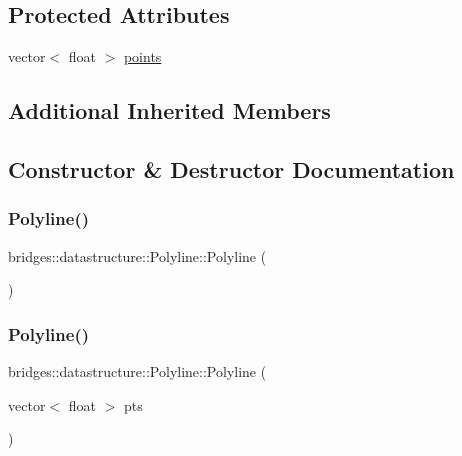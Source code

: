 \subsection*{Protected Attributes}
\begin{DoxyCompactItemize}
\item 
vector$<$ float $>$ \hyperlink{classbridges_1_1datastructure_1_1_polyline_a0df21b6c3cc82930a93a495de5affda7}{points}
\end{DoxyCompactItemize}
\subsection*{Additional Inherited Members}


\subsection{Constructor \& Destructor Documentation}
\mbox{\label{classbridges_1_1datastructure_1_1_polyline_a488f6612485fc66534035c3574281a11}} 
\subsubsection{\texorpdfstring{Polyline()}{Polyline()}\hspace{0.1cm}{\footnotesize\ttfamily [1/2]}}
{\footnotesize\ttfamily bridges\+::datastructure\+::\+Polyline\+::\+Polyline (\begin{DoxyParamCaption}{ }\end{DoxyParamCaption})\hspace{0.3cm}{\ttfamily [inline]}}

\mbox{\label{classbridges_1_1datastructure_1_1_polyline_aceb69c3294ab4c16b2931e1073d3f996}} 
\subsubsection{\texorpdfstring{Polyline()}{Polyline()}\hspace{0.1cm}{\footnotesize\ttfamily [2/2]}}
{\footnotesize\ttfamily bridges\+::datastructure\+::\+Polyline\+::\+Polyline (\begin{DoxyParamCaption}\item[{vector$<$ float $>$}]{pts }\end{DoxyParamCaption})\hspace{0.3cm}{\ttfamily [inline]}}

